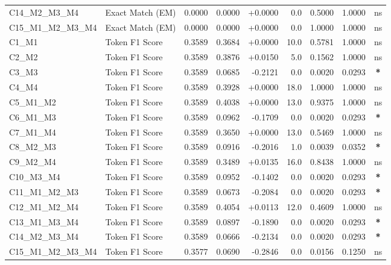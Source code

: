 \begin{table}[p]
\begin{tabular*}{\textwidth}{@{\extracolsep{\fill}} l l r r r r r r c @{}}
\addlinespace
C14\_M2\_M3\_M4 & Exact Match (EM)     & 0.0000 & 0.0000 & +0.0000 & 0.0 & 0.5000 & 1.0000 & ns \\
\addlinespace
C15\_M1\_M2\_M3\_M4 & Exact Match (EM)     & 0.0000 & 0.0000 & +0.0000 & 0.0 & 1.0000 & 1.0000 & ns \\
\addlinespace
C1\_M1          & Token F1 Score       & 0.3589 & 0.3684 & +0.0000 & 10.0 & 0.5781 & 1.0000 & ns \\
\addlinespace
C2\_M2          & Token F1 Score       & 0.3589 & 0.3876 & +0.0150 & 5.0 & 0.1562 & 1.0000 & ns \\
\addlinespace
C3\_M3          & Token F1 Score       & 0.3589 & 0.0685 & -0.2121 & 0.0 & 0.0020 & 0.0293 & \textbf{*} \\
\addlinespace
C4\_M4          & Token F1 Score       & 0.3589 & 0.3928 & +0.0000 & 18.0 & 1.0000 & 1.0000 & ns \\
\addlinespace
C5\_M1\_M2      & Token F1 Score       & 0.3589 & 0.4038 & +0.0000 & 13.0 & 0.9375 & 1.0000 & ns \\
\addlinespace
C6\_M1\_M3      & Token F1 Score       & 0.3589 & 0.0962 & -0.1709 & 0.0 & 0.0020 & 0.0293 & \textbf{*} \\
\addlinespace
C7\_M1\_M4      & Token F1 Score       & 0.3589 & 0.3650 & +0.0000 & 13.0 & 0.5469 & 1.0000 & ns \\
\addlinespace
C8\_M2\_M3      & Token F1 Score       & 0.3589 & 0.0916 & -0.2016 & 1.0 & 0.0039 & 0.0352 & \textbf{*} \\
\addlinespace
C9\_M2\_M4      & Token F1 Score       & 0.3589 & 0.3489 & +0.0135 & 16.0 & 0.8438 & 1.0000 & ns \\
\addlinespace
C10\_M3\_M4     & Token F1 Score       & 0.3589 & 0.0952 & -0.1402 & 0.0 & 0.0020 & 0.0293 & \textbf{*} \\
\addlinespace
C11\_M1\_M2\_M3 & Token F1 Score       & 0.3589 & 0.0673 & -0.2084 & 0.0 & 0.0020 & 0.0293 & \textbf{*} \\
\addlinespace
C12\_M1\_M2\_M4 & Token F1 Score       & 0.3589 & 0.4054 & +0.0113 & 12.0 & 0.4609 & 1.0000 & ns \\
\addlinespace
C13\_M1\_M3\_M4 & Token F1 Score       & 0.3589 & 0.0897 & -0.1890 & 0.0 & 0.0020 & 0.0293 & \textbf{*} \\
\addlinespace
C14\_M2\_M3\_M4 & Token F1 Score       & 0.3589 & 0.0666 & -0.2134 & 0.0 & 0.0020 & 0.0293 & \textbf{*} \\
\addlinespace
C15\_M1\_M2\_M3\_M4 & Token F1 Score       & 0.3577 & 0.0690 & -0.2846 & 0.0 & 0.0156 & 0.1250 & ns \\

\end{tabular*}
\end{table}
